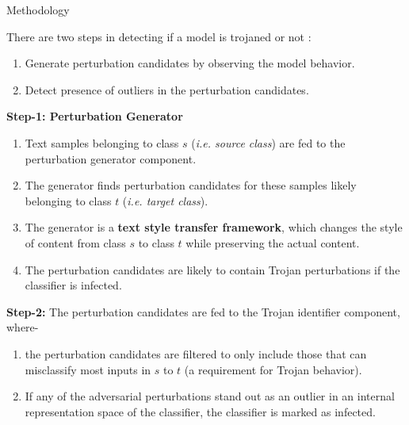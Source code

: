 \begin{frame}[allowframebreaks]{Methodology}
\framebreak

There are two steps in detecting if a model is trojaned or not \cite{azizi2021tminer}:
\begin{enumerate}
    \item Generate perturbation candidates by observing the model behavior.
    \item Detect presence of outliers in the perturbation candidates.
\end{enumerate}

\framebreak

\textbf{Step-1: Perturbation Generator}
\begin{enumerate}
    \item Text samples belonging to class $s$ (\textit{i.e. source class}) are fed to the perturbation generator component.
    \item The generator finds perturbation candidates for these samples likely belonging to class $t$ (\textit{i.e. target class}).
    \item The generator is a \textbf{text style transfer framework}, which changes the style of content from class $s$ to class $t$ while preserving the actual content.
    \item The perturbation candidates are likely to contain Trojan perturbations if the classifier is infected.
\end{enumerate}

\framebreak

\textbf{Step-2: } The perturbation candidates are fed to the Trojan identifier component, where-
\begin{enumerate}
    \item the perturbation candidates are filtered to only include those that can misclassify most inputs in $s$ to $t$ (a requirement for Trojan behavior).
    \item If any of the adversarial perturbations stand out as an outlier in an internal representation space of the classifier, the classifier is marked as infected.
\end{enumerate}

\end{frame}